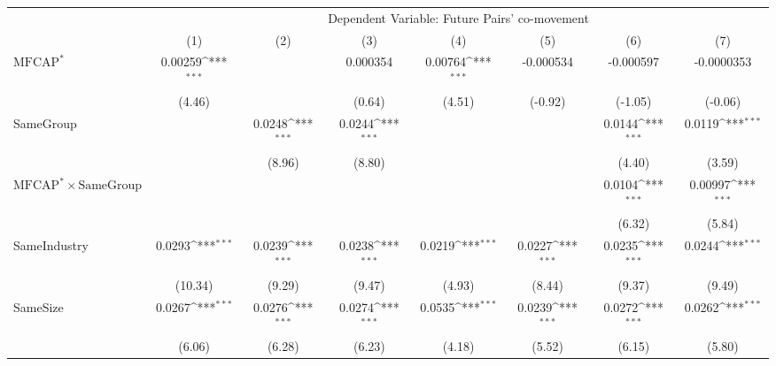{
\def\sym#1{\ifmmode^{#1}\else\(^{#1}\)\fi}
\begin{tabular}{l*{7}{c}}
\hline\hline
                &\multicolumn{7}{c}{Dependent Variable: Future Pairs' co-movement}                                                                   \\\cmidrule(lr){2-8}
                &\multicolumn{1}{c}{(1)}         &\multicolumn{1}{c}{(2)}         &\multicolumn{1}{c}{(3)}         &\multicolumn{1}{c}{(4)}         &\multicolumn{1}{c}{(5)}         &\multicolumn{1}{c}{(6)}         &\multicolumn{1}{c}{(7)}         \\
\hline
$ \text{MFCAP}^* $&  0.00259\sym{***}&                  & 0.000354         &  0.00764\sym{***}&-0.000534         &-0.000597         &-0.0000353         \\
                &   (4.46)         &                  &   (0.64)         &   (4.51)         &  (-0.92)         &  (-1.05)         &  (-0.06)         \\
[1em]
SameGroup       &                  &   0.0248\sym{***}&   0.0244\sym{***}&                  &                  &   0.0144\sym{***}&   0.0119\sym{***}\\
                &                  &   (8.96)         &   (8.80)         &                  &                  &   (4.40)         &   (3.59)         \\
[1em]
 $ \text{MFCAP}^* \times {\text{SameGroup} }  $ &                  &                  &                  &                  &                  &   0.0104\sym{***}&  0.00997\sym{***}\\
                &                  &                  &                  &                  &                  &   (6.32)         &   (5.84)         \\
[1em]
SameIndustry    &   0.0293\sym{***}&   0.0239\sym{***}&   0.0238\sym{***}&   0.0219\sym{***}&   0.0227\sym{***}&   0.0235\sym{***}&   0.0244\sym{***}\\
                &  (10.34)         &   (9.29)         &   (9.47)         &   (4.93)         &   (8.44)         &   (9.37)         &   (9.49)         \\
[1em]
SameSize        &   0.0267\sym{***}&   0.0276\sym{***}&   0.0274\sym{***}&   0.0535\sym{***}&   0.0239\sym{***}&   0.0272\sym{***}&   0.0262\sym{***}\\
                &   (6.06)         &   (6.28)         &   (6.23)         &   (4.18)         &   (5.52)         &   (6.15)         &   (5.80)         \\

\end{tabular}}
